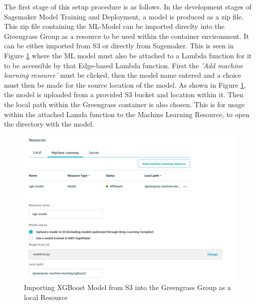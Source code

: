 The first stage of this setup procedure is as follows. In the development stages of Sagemaker Model Training and Deployment, a model is produced as a zip file. This zip file containing the ML-Model can be imported direclty into the Greengrass Group as a resource to be used within the container environment. It can be either imported from S3 or directly from Sagemaker. This is seen in Figure \ref{fig:ggc_model_import} where the ML model must also be attached to a Lambda function for it to be accessible by that Edge-based Lambda function. First the \textit{'Add machine learning resource'} must be clicked, then the model name entered and a choice must then be made for the source location of the model. As shown in Figure \ref{fig:ggc_model_import}, the model is uploaded from a provided S3 bucket and location within it. Then the local path within the Greengrass container is also chosen. This is for usage within the attached Lamda function to the Machine Learning Resource, to open the directory with the model.

\begin{figure}[ht]
    \centering
    \includegraphics[width=1\linewidth]{pages/Chapter4/Chapter 4 Images/LambdaFns/xgboost_model_import_ggc.png}
    \caption{Importing XGBoost Model from S3 into the Greengrass Group as a local Resource}
    \label{fig:ggc_model_import}
\end{figure}

